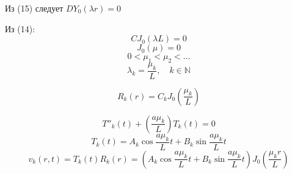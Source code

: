 \documentclass[a4paper]{article}
\begin{document}
Из (15) следует $ D Y_0(\lambda r) = 0 $ 

Из (14):
\[
    C J_0(\lambda L) = 0
\]
\[
    J_0(\mu) = 0
\]
\[
    0 < \mu_1 < \mu_2 < \dots
\]
\begin{equation}
    \lambda_k = \frac{\mu_k}{L}, \quad k \in \mathbb{N}
\end{equation}

\begin{equation}
    R_k(r) = C_k J_0\left(\frac{\mu_k}{L} \right)
\end{equation}

\[
    T''_k(t) + \left( \frac{a\mu_k}{L} \right) T_k(t) = 0
\]
\[
    T_k(t) = A_k \cos \frac{a\mu_k}{L} t + B_k \sin \frac{a\mu_k}{L} t
\]
\[
    v_k(r,t) = T_k(t)R_k(r) = \left(A_k \cos \frac{a\mu_k}{L} t + B_k \sin \frac{a\mu_k}{L} t\right)
    J_0\left( \frac{\mu_k r}{L} \right)
\]
\end{document}
